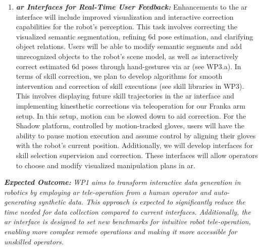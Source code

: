 \documentclass{erc-B2}
\begin{document}
\begin{enumerate}
\item \textit{\textbf{\gls*{ar} Interfaces for Real-Time User Feedback:}} Enhancements to the \gls*{ar} interface will include improved visualization and interactive correction capabilities for the robot's perception. This task involves correcting the visualized semantic segmentation, refining \gls*{6d} pose estimation, and clarifying object relations. Users will be able to modify semantic segments and add unrecognized objects to the robot's scene model, as well as interactively correct estimated \gls*{6d} poses through hand-gestures via \gls*{ar} (see WP3.a). 
In terms of skill correction, we plan to develop algorithms for smooth intervention and correction of skill executions (see skill libraries in WP3). This involves displaying future skill trajectories in the \gls*{ar} interface and implementing kinesthetic corrections via teleoperation for our Franka arm setup. In this setup, motion can be slowed down to aid correction. For the Shadow platform, controlled by motion-tracked gloves, users will have the ability to pause motion execution and assume control by aligning their gloves with the robot's current position.
Additionally, we will develop interfaces for skill selection supervision and correction. These interfaces will allow operators to choose and modify visualized manipulation plans in \gls*{ar}.%
\end{enumerate}
\textbf{\textit{Expected Outcome:}} \textit{WP1 aims to transform interactive data generation in robotics by employing \gls*{ar} tele-operation from a human operator and auto-generating synthetic data. This approach is expected to significantly reduce the time needed for data collection compared to current interfaces. Additionally, the \gls*{ar} interface is designed to set new benchmarks for intuitive robot tele-operation, enabling more complex remote operations and making it more accessible for unskilled operators.}


\end{document}
